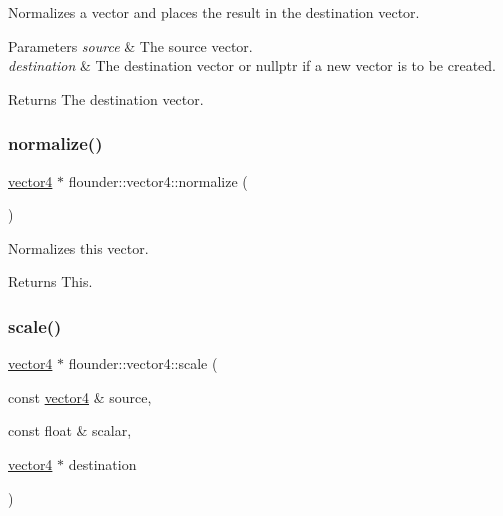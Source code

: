 Normalizes a vector and places the result in the destination vector. 


\begin{DoxyParams}{Parameters}
{\em source} & The source vector. \\
\hline
{\em destination} & The destination vector or nullptr if a new vector is to be created. \\
\hline
\end{DoxyParams}
\begin{DoxyReturn}{Returns}
The destination vector. 
\end{DoxyReturn}
\mbox{\label{classflounder_1_1vector4_aa9eec0ab63428f78de24ac90f2a20206}} 
\subsubsection{\texorpdfstring{normalize()}{normalize()}\hspace{0.1cm}{\footnotesize\ttfamily [2/2]}}
{\footnotesize\ttfamily \hyperlink{classflounder_1_1vector4}{vector4} $\ast$ flounder\+::vector4\+::normalize (\begin{DoxyParamCaption}{ }\end{DoxyParamCaption})}



Normalizes this vector. 

\begin{DoxyReturn}{Returns}
This. 
\end{DoxyReturn}
\mbox{\label{classflounder_1_1vector4_a5b5371c3619896e32b0332a336a10ee3}} 
\subsubsection{\texorpdfstring{scale()}{scale()}\hspace{0.1cm}{\footnotesize\ttfamily [1/2]}}
{\footnotesize\ttfamily \hyperlink{classflounder_1_1vector4}{vector4} $\ast$ flounder\+::vector4\+::scale (\begin{DoxyParamCaption}\item[{const \hyperlink{classflounder_1_1vector4}{vector4} \&}]{source,  }\item[{const float \&}]{scalar,  }\item[{\hyperlink{classflounder_1_1vector4}{vector4} $\ast$}]{destination }\end{DoxyParamCaption})\hspace{0.3cm}{\ttfamily [static]}}




